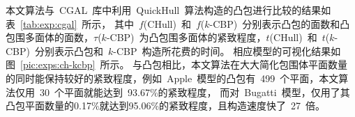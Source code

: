 本文算法与~CGAL~库中利用~QuickHull~算法构造的凸包进行比较的结果如表~\ref{tab:exp:cgal}~所示，
其中~$f$(CHull)~和~$f$($k$-CBP)~分别表示凸包的面数和凸包围多面体的面数，$\tau$($k$-CBP)~为凸包围多面体的紧致程度，$t$(CHull)~和~$t$($k$-CBP)~分别表示凸包和~$k$-CBP~构造所花费的时间。
相应模型的可视化结果如图~\ref{pic:exps:ch-kcbp}~所示。
与凸包相比，本文算法在大大简化包围体平面数量的同时能保持较好的紧致程度，例如~Apple~模型的凸包有~499~个平面，本文算法仅用~30~个平面就能达到~93.67\%的紧致程度，
而对~Bugatti~模型，仅用了其凸包平面数量的0.17\%就达到95.06\%的紧致程度，且构造速度快了~27~倍。



